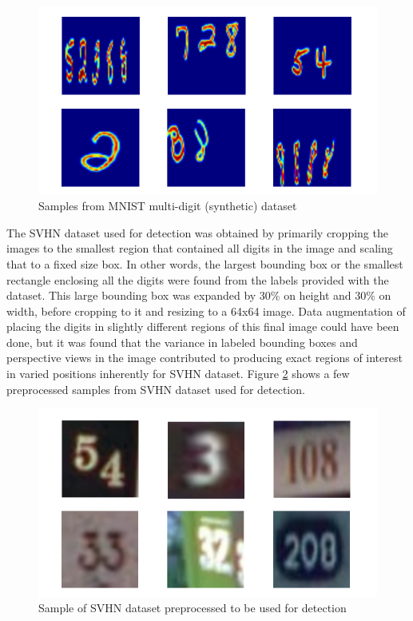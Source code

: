 \documentclass{article}
\begin{document}
	\begin{figure}[h]
		\centering
		\includegraphics[scale=0.5]{mnist_multi_sample}
		\caption{Samples from MNIST multi-digit (synthetic) dataset}
		\label{fig:mnist_multi_sample}
	\end{figure}
	
	The SVHN dataset used for detection was obtained by primarily cropping the images to the smallest region that contained all digits in the image and scaling that to a fixed size box. In other words, the largest bounding box or the smallest rectangle enclosing all the digits were found from the labels provided with the dataset. This large bounding box was expanded by 30\% on height and 30\% on width, before cropping to it and resizing to a 64x64 image. Data augmentation of placing the digits in slightly different regions of this final image could have been done, but it was found that the variance in labeled bounding boxes and perspective views in the image contributed to producing exact regions of interest in varied positions inherently for SVHN dataset. Figure \ref{fig:svhn_detection_sample} shows a few preprocessed samples from SVHN dataset used for detection.
	
	\begin{figure}[h]
		\centering
		\includegraphics[scale=0.5]{svhn_detection_sample}
		\caption{Sample of SVHN dataset preprocessed to be used for detection}
		\label{fig:svhn_detection_sample}
	\end{figure}
	
\end{document}
